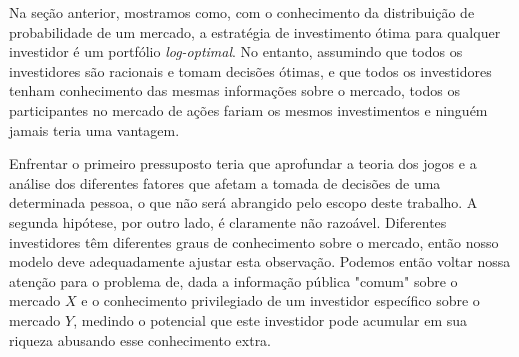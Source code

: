 Na seção anterior, mostramos como, com o conhecimento da distribuição de probabilidade de um mercado, a estratégia de investimento ótima para qualquer investidor é um portfólio \emph{log-optimal}. No entanto, assumindo que todos os investidores são racionais e tomam decisões ótimas, e que todos os investidores tenham conhecimento das mesmas informações sobre o mercado, todos os participantes no mercado de ações fariam os mesmos investimentos e ninguém jamais teria uma vantagem.

Enfrentar o primeiro pressuposto teria que aprofundar a teoria dos jogos e a análise dos diferentes fatores que afetam a tomada de decisões de uma determinada pessoa, o que não será abrangido pelo escopo deste trabalho. A segunda hipótese, por outro lado, é claramente não razoável. Diferentes investidores têm diferentes graus de conhecimento sobre o mercado, então nosso modelo deve adequadamente ajustar esta observação. Podemos então voltar nossa atenção para o problema de, dada a informação pública "comum" sobre o mercado $ X $ e o conhecimento privilegiado de um investidor específico sobre o mercado $ Y $, medindo o potencial que este investidor pode acumular em sua riqueza abusando esse conhecimento extra.
